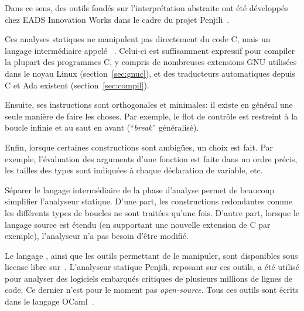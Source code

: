 

Dans ce sens, des outils fondés sur l'interprétation abstraite ont été
développés chez EADS Innovation Works dans le cadre du projet
Penjili~\cite{AllamigeonHymansSSTIC07}.


Ces analyses statiques ne manipulent pas directement du code C, mais un langage
intermédiaire appelé \newspeak~\cite{newspeak}. Celui-ci est suffisamment
expressif pour compiler la plupart des programmes C, y compris de nombreuses
extensions GNU utilisées dans le noyau Linux (section~\ref{sec:gnuc}), et des
traducteurs automatiques depuis C et Ada existent (section~\ref{sec:compil}).

Ensuite, ses instructions sont orthogonales et minimales: il existe en général
une seule manière de faire les choses. Par exemple, le flot de contrôle est
restreint à la boucle infinie et au saut en avant (\enquote{\emph{break}}
généralisé).

Enfin, lorsque certaines constructions sont ambigües, un choix est fait. Par
exemple, l'évaluation des arguments d'une fonction est faite dans un ordre
précis, les tailles des types sont indiquées à chaque déclaration de variable,
etc.

Séparer le langage intermédiaire de la phase d'analyse permet de beaucoup
simplifier l'analyseur statique. D'une part, les constructions redondantes comme
les différents types de boucles ne sont traitées qu'une fois. D'autre part,
lorsque le langage source est étendu (en supportant une nouvelle extension de C
par exemple), l'analyseur n'a pas besoin d'être modifié.

Le langage \newspeak, ainsi que les outils permettant de le manipuler, sont
disponibles sous license libre sur~. L'analyseur statique Penjili,
reposant sur ces outils, a été utilisé pour analyser des logiciels embarqués
critiques de plusieurs millions de lignes de code. Ce dernier n'est pour le
moment pas \emph{open-source}. Tous ces outils sont écrits dans le langage
OCaml~\cite{DAOC}.

